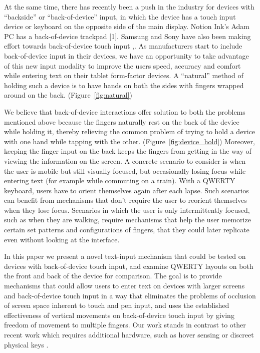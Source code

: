 At the same time, there has recently been a push in the industry for
devices with ``backside'' or ``back-of-device'' input, in which the
device has a touch input device or keyboard on the opposite side of
the main display. Notion Ink's Adam PC has a back-of-device trackpad
[1]. Samsung and Sony have also been making effort towards back-of-device
touch input \cite{Samsung},\cite{Sony}. As manufacturers start to
include back-of-device input in their devices, we have an opportunity to
take advantage of this new input modality to improve the users speed,
accuracy and comfort while entering text on their tablet form-factor
devices. A ``natural'' method of holding such a device is to have hands
on both the sides with fingers wrapped around on the
back. \cite{Vogel} (Figure~\ref{fig:natural})

We believe that back-of-device interactions offer solution to both the problems mentioned above because the fingers naturally rest on the back of the device while holding it, thereby relieving the common problem of trying to hold a device with one hand while tapping with the other. (Figure~\ref{fig:device_hold}) Moreover, keeping the finger input on the back keeps the fingers from getting in the way of viewing the information on the screen. A concrete scenario to consider is when the user is mobile but still visually focused, but occasionally losing focus while entering text (for example while commuting on a train).  With a QWERTY keyboard, users have to orient themselves again after each lapse. Such scenarios can benefit from mechanisms that don't require the user to reorient themselves when they lose focus.  Scenarios in which the user is only intermittently focused, such as when they are walking, require mechanisms that help the user memorize certain set patterns and configurations of fingers, that they could later replicate even without looking at the interface. 

In this paper we present a novel text-input mechanism that could be tested on devices with back-of-device touch input, and examine QWERTY layouts on both the front and back of the device for comparison. The goal is to provide mechanisms that could allow users to enter text on
devices with larger screens and back-of-device touch input in a way that eliminates the problems of occlusion of screen space inherent to touch and pen input, and uses the established effectiveness of
vertical movements on back-of-device touch input \cite{Wobbrock} by giving freedom of movement to multiple fingers.  Our work stands in contrast to other recent work which requires additional hardware, such as hover sensing \cite{LucidTouch} or discreet physical keys \cite{RearType}.

